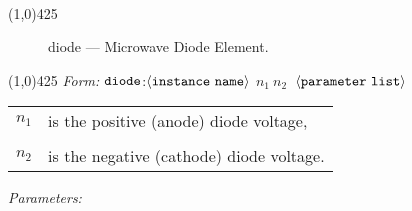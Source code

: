 \documentclass{article}
\begin{document}
\\
\hrulefill\linethickness{0.5mm}\line(1,0){425}
\normalsize
\newline
\begin{figure}[h]
\centerline{\epsfxsize=1in} \caption{diode
--- Microwave Diode Element.}
\end{figure}
\newline
\linethickness{0.5mm} \line(1,0){425}
\newline
\textit{Form:}
$\tt diode$:$\langle \tt{instance\ name}\rangle$
$n_1\ n_2\ $ $\langle \tt{parameter\ list}\rangle$
\newline
\begin{tabular}{r l}
$n_1$ & is the positive (anode) diode voltage, \\
&  \\
$n_2$ & is the negative (cathode) diode voltage. \\
\end{tabular}
\newline
\textit{Parameters:}\\
\end{document}
